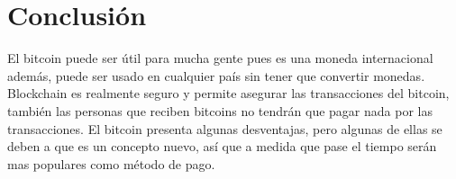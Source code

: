 \documentclass[10pt,journal,compsoc]{IEEEtran}
\begin{document}
%






\section{Conclusión}

El bitcoin puede ser útil para mucha gente pues es una moneda internacional además, puede ser usado en cualquier país sin tener que convertir monedas. Blockchain es realmente seguro y permite asegurar las transacciones del bitcoin, también las personas que reciben bitcoins no tendrán que pagar nada por las transacciones. El bitcoin presenta  algunas desventajas, pero algunas de ellas se deben a que es un concepto nuevo, así que a medida que pase el tiempo serán mas populares como método de pago.
\end{document}
